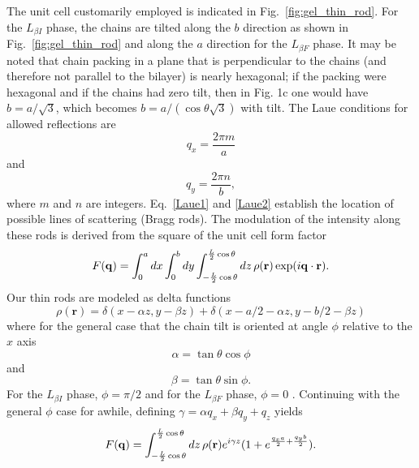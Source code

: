 The unit cell customarily employed is indicated in Fig.~\ref{fig:gel_thin_rod}.  
For the $L_{{\beta}I}$ phase, the chains 
are tilted along the $b$ direction 
as shown in Fig.~\ref{fig:gel_thin_rod} and along the $a$ direction for 
the $L_{{\beta}F}$ phase.  
It may be noted that chain packing in a plane that is perpendicular to the 
chains (and therefore not parallel to the bilayer) is nearly hexagonal; if 
the packing were hexagonal and if the chains had zero tilt, then in Fig. 1c 
one would have $b=a/\sqrt{3}$, which becomes $b=a/(\cos{\theta}\sqrt{3})$ with tilt.  
The Laue conditions for allowed reflections are 
\begin{equation}\label{Laue1}
  q_x=\frac{2 \pi m}{a}
\end{equation}
and
\begin{equation}\label{Laue2}
  q_y=\frac{2 \pi n}{b}, 
\end{equation}
where $m$ and $n$ are integers.
Eq.~\ref{Laue1} and \ref{Laue2} 
establish the location of possible lines of scattering (Bragg rods). 
The modulation of the intensity along these rods is derived from the square 
of the unit cell form factor
\begin{equation}\label{S(q)}
  F(\mathbf{q}) = \int_{0}^{a}dx\int_{0}^{b}dy
  \int_{-\frac{L}{2}\cos\theta}^{\frac{L}{2}\cos\theta}
  \mathop{dz}\rho(\mathbf{r})\exp(i\mathbf{q}\cdot\mathbf{r}).
\end{equation}
Our thin rods are modeled as delta functions
\begin{equation}\label{rods}
  \rho(\mathbf{r})=\delta(x-{\alpha}z,y-{\beta}z)+\delta(x-a/2-{\alpha}z,y-b/2-{\beta}z)
\end{equation}
where for the general case that the chain tilt is oriented at angle $\phi$ 
relative to the $x$ axis 
\begin{equation}\label{alpha}
  \alpha=\tan{\theta}\cos{\phi}
\end{equation}
and
\begin{equation}\label{beta}
  \beta=\tan{\theta}\sin{\phi}.
\end{equation}
For the $L_{{\beta}I}$ phase, $\phi={\pi}/2$ and for the $L_{{\beta}F}$ phase, 
$\phi=0$ .  Continuing with the general $\phi$ case for awhile,
defining $\gamma = {\alpha}q_x+{\beta}q_y+q_z$ yields
\begin{equation}\label{S(q)}
  F(\mathbf{q}) = \int_{-\frac{L}{2}\cos{\theta}}^{\frac{L}{2}\cos{\theta}}\mathop{dz}
  \rho(\mathbf{r})e^{i{\gamma}z}(1+e^{\frac{q_xa}{2}+\frac{q_yb}{2}}).
\end{equation}

